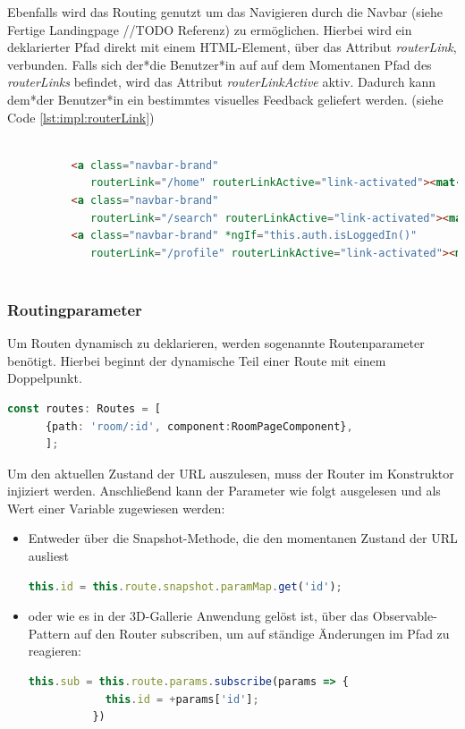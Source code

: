 Ebenfalls wird das Routing genutzt um das Navigieren durch die Navbar (siehe Fertige Landingpage //TODO Referenz) zu ermöglichen. Hierbei wird ein deklarierter Pfad direkt mit einem HTML-Element, über das Attribut \emph{routerLink}, verbunden. Falls sich der*die Benutzer*in auf auf dem Momentanen Pfad des \emph{routerLinks} befindet, wird das Attribut \emph{routerLinkActive} aktiv. Dadurch kann dem*der Benutzer*in ein bestimmtes visuelles Feedback geliefert werden.  (siehe Code \ref{lst:impl:routerLink})

\begin{lstlisting}[caption={Routing über einen routerLink},language=HTML,label=lst:impl:routerLink]
    
          <a class="navbar-brand"
             routerLink="/home" routerLinkActive="link-activated"><mat-icon>home</mat-icon>Home</a>
          <a class="navbar-brand"
             routerLink="/search" routerLinkActive="link-activated"><mat-icon>search</mat-icon>Search</a>
          <a class="navbar-brand" *ngIf="this.auth.isLoggedIn()"
             routerLink="/profile" routerLinkActive="link-activated"><mat-icon>person</mat-icon>Profile</a>
       
\end{lstlisting}

\subsubsection{Routingparameter}
\label{Routingparameter}
Um Routen dynamisch zu deklarieren, werden sogenannte Routenparameter benötigt. Hierbei beginnt der dynamische Teil einer Route mit einem Doppelpunkt. 


\begin{lstlisting}[caption={Routingparamter in der 3D-Gallery},language=TypeScript,label=lst:impl:routingparameter]
    const routes: Routes = [
      {path: 'room/:id', component:RoomPageComponent},
      ];    
\end{lstlisting}

Um den aktuellen Zustand der URL auszulesen, muss der Router im Konstruktor injiziert werden. Anschließend kann der Parameter wie folgt ausgelesen und als Wert einer Variable zugewiesen werden:

\begin{itemize}
    \item Entweder über die Snapshot-Methode, die den momentanen Zustand der URL ausliest 
    \begin{lstlisting}[caption={Snapshot der URL abfragen},language=TypeScript,label=lst:impl:routingsnapshot]
        this.id = this.route.snapshot.paramMap.get('id');
    \end{lstlisting}
    \item oder wie es in der 3D-Gallerie Anwendung gelöst ist, über das Observable-Pattern auf den Router subscriben, um auf ständige Änderungen im Pfad zu reagieren:
    \begin{lstlisting}[caption={Die URL subscriben},language=TypeScript,label=lst:impl:urlsubscription]
        this.sub = this.route.params.subscribe(params => {
            this.id = +params['id'];
          })
    \end{lstlisting}
\end{itemize}
\cite{AngularBuch}